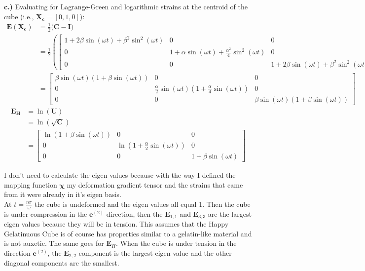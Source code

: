 \textbf{c.)}
Evaluating for Lagrange-Green and logarithmic strains at the centroid of the cube (i.e., $\mathbf{X_c} = [0,1,0]$):
\begin{align*}
\mathbf{E}(\mathbf{X_c}) &= \frac{1}{2}(\mathbf{C}-\mathbf{I)} \\
&= \frac{1}{2} \left(\begin{bmatrix}
    1+2\beta\sin(\omega t)+\beta^2\sin^2(\omega t) & 0 & 0 \\ 0 & 1+ \alpha\sin(\omega t) + \frac{\alpha^2}{4}\sin^2(\omega t) & 0 \\ 0 & 0 & 1 + 2 \beta \sin(\omega t)+\beta^2\sin^2(\omega t)
\end{bmatrix} - \mathbf{I}\right) \\ 
&= \begin{bmatrix}
    \beta\sin(\omega t)(1+\beta\sin(\omega t)) & 0 & 0 \\ 0 & \frac{\alpha}{2}\sin(\omega t)(1 + \frac{\alpha}{4}\sin(\omega t)) & 0 \\ 0 & 0 & \beta\sin(\omega t)(1+\beta\sin(\omega t))
\end{bmatrix}
\end{align*}
\begin{align*}
\mathbf{E_H} &= \ln(\mathbf{U}) \\
&= \ln(\sqrt{\mathbf{C}}) \\
&= \begin{bmatrix}
    \ln(1+\beta\sin(\omega t)) & 0 & 0 \\ 0 & \ln(1+\frac{\alpha}{2}\sin(\omega t)) & 0 \\ 0 & 0 & 1 + \beta\sin(\omega t)
\end{bmatrix}
\end{align*}

I don't need to calculate the eigen values because with the way I defined the mapping function $\mathbf{\chi}$ my deformation gradient tensor and the strains that came from it were already in it's eigen basis. \\

At $t = \frac{n\pi}{\omega}$ the cube is undeformed and the eigen values all equal 1. Then the cube is under-compression in the $\mathbf{e}^{(2)}$ direction, then the $\mathbf{E}_{1,1}$ and $\mathbf{E}_{3,3}$ are the largest eigen values because they will be in tension. This assumes that the Happy Gelatinuous Cube is of course has properties similar to a gelatin-like material and is not auxetic. The same goes for $\mathbf{E}_H$. When the cube is under tension in the direction $\mathbf{e}^{(2)}$, the $\mathbf{E}_{2,2}$ component is the largest eigen value and the other diagonal components are the smallest. \\

